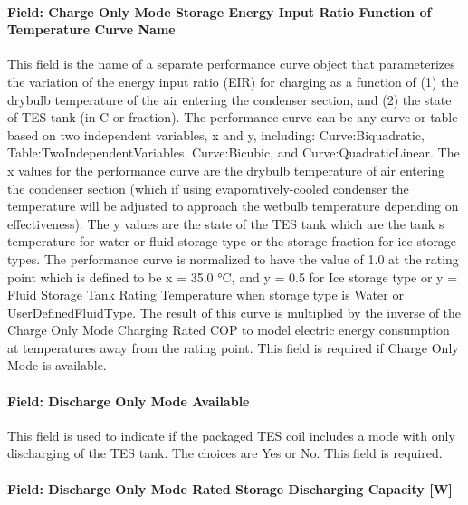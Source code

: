 \paragraph{Field: Charge Only Mode Storage Energy Input Ratio Function of Temperature Curve Name}\label{field-charge-only-mode-storage-energy-input-ratio-function-of-temperature-curve-name}

This field is the name of a separate performance curve object that parameterizes the variation of the energy input ratio (EIR) for charging as a function of (1) the drybulb temperature of the air entering the condenser section, and (2) the state of TES tank (in C or fraction). The performance curve can be any curve or table based on two independent variables, x and y, including: Curve:Biquadratic, Table:TwoIndependentVariables, Curve:Bicubic, and Curve:QuadraticLinear. The x values for the performance curve are the drybulb temperature of air entering the condenser section (which if using evaporatively-cooled condenser the temperature will be adjusted to approach the wetbulb temperature depending on effectiveness). The y values are the state of the TES tank which are the tank s temperature for water or fluid storage type or the storage fraction for ice storage types. The performance curve is normalized to have the value of 1.0 at the rating point which is defined to be x = 35.0 °C, and y = 0.5 for Ice storage type or y = Fluid Storage Tank Rating Temperature when storage type is Water or UserDefinedFluidType. The result of this curve is multiplied by the inverse of the Charge Only Mode Charging Rated COP to model electric energy consumption at temperatures away from the rating point. This field is required if Charge Only Mode is available.

\paragraph{Field: Discharge Only Mode Available}\label{field-discharge-only-mode-available}

This field is used to indicate if the packaged TES coil includes a mode with only discharging of the TES tank. The choices are Yes or No. This field is required.

\paragraph{Field: Discharge Only Mode Rated Storage Discharging Capacity {[}W{]}}\label{field-discharge-only-mode-rated-storage-discharging-capacity-w}

